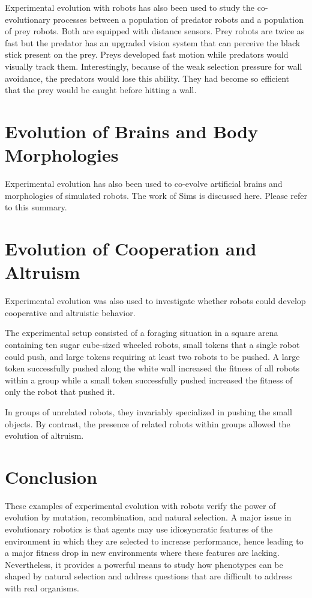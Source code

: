 \documentclass[../main.tex]{subfiles}
\begin{document}
\begin{experiment}
Experimental evolution with robots has also been used to study the co-evolutionary processes between a population of
predator robots and a population of prey robots. Both are equipped with distance sensors. Prey robots are twice as
fast but the predator has an upgraded vision system that can perceive the black stick present on the prey. Preys
developed fast motion while predators would visually track them. Interestingly, because of the weak selection pressure
for wall avoidance, the predators would lose this ability. They had become so efficient that the prey would be caught
before hitting a wall.
\end{experiment}

\section{Evolution of Brains and Body Morphologies}
Experimental evolution has also been used to co-evolve artificial brains and morphologies of simulated robots. The work
of Sims \cite{Sims:1994:EMB:1667943.1667946} is discussed here. Please refer to this summary.

\section{Evolution of Cooperation and Altruism}
Experimental evolution was also used to investigate whether robots could develop cooperative and altruistic behavior.

\begin{experiment}
The experimental setup consisted of a foraging situation in a square arena containing ten sugar cube-sized wheeled
robots, small tokens that a single robot could push, and large tokens requiring at least two robots to be pushed. A
large token successfully pushed along the white wall increased the fitness of all robots within a group while a small
token successfully pushed increased the fitness of only the robot that pushed it.

In groups of unrelated robots, they invariably specialized in pushing the small objects. By contrast, the presence of
related robots within groups allowed the evolution of altruism.
\end{experiment}

\section{Conclusion}
These examples of experimental evolution with robots verify the power of evolution by mutation, recombination, and
natural selection. A major issue in evolutionary robotics is that agents may use idiosyncratic features of the
environment in which they are selected to increase performance, hence leading to a major fitness drop in new
environments where these features are lacking. Nevertheless, it provides a powerful means to study how phenotypes can
be shaped by natural selection and address questions that are difficult to address with real organisms.
\end{document}
